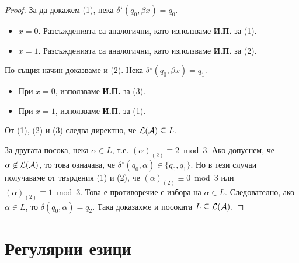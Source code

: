 \begin{proof}
  За да докажем (1), нека $\delta^\star(q_0,\beta x) = q_0$. 
  \begin{itemize}
  \item 
    $x = 0$. Разсъжденията са аналогични, като използваме {\bf И.П.} за (1).
  \item
    $x = 1$. Разсъжденията са аналогични, като използваме {\bf И.П.} за (2).
  \end{itemize}
  
  По същия начин доказваме и (2). Нека $\delta^\star(q_0,\beta x) = q_1$. 
  \begin{itemize}
  \item 
    При $x = 0$, използваме {\bf И.П.} за (3).
  \item
    При $x = 1$, използваме {\bf И.П.} за (1).
  \end{itemize}

  От (1), (2) и (3) следва директно, че $\mathcal{L}(\mathcal{A}) \subseteq L$.
  
  За другата посока, нека $\alpha \in L$, т.е. $(\alpha)_{(2)} \equiv 2 \bmod 3$.
  Ако допуснем, че $\alpha \not\in \mathcal{L}(\mathcal{A})$, то това означава, че $\delta^\star(q_0,\alpha) \in \{q_0,q_1\}$.
  Но в тези случаи получаваме от твърдения (1) и (2), че $(\alpha)_{(2)} \equiv 0 \bmod 3$ или $(\alpha)_{(2)} \equiv 1 \bmod 3$.
  Това е противоречие с избора на $\alpha \in L$. Следователно, ако $\alpha \in L$, то $\delta(q_0,\alpha) = q_2$.
  Така доказахме и посоката $L \subseteq \mathcal{L}(\mathcal{A})$.
\end{proof}

\section{Регулярни езици}

